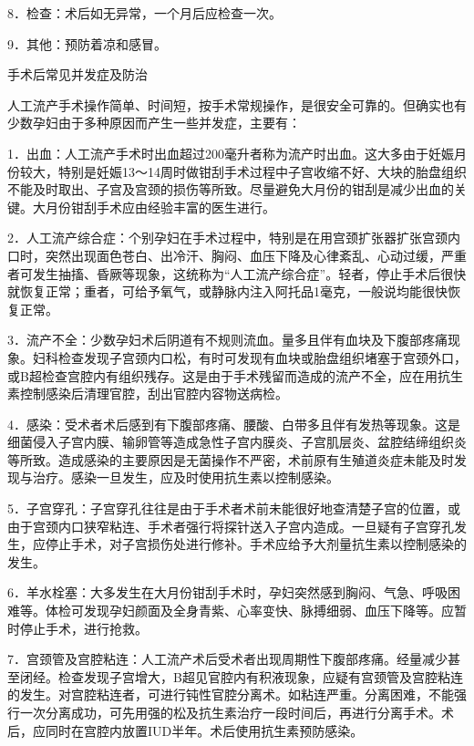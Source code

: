 \documentclass[12pt,UTF8,openany]{ctexbook}
\begin{document}
8．检查：术后如无异常，一个月后应检查一次。

9．其他：预防着凉和感冒。





手术后常见并发症及防治


人工流产手术操作简单、时间短，按手术常规操作，是很安全可靠的。但确实也有少数孕妇由于多种原因而产生一些并发症，主要有：

1．出血：人工流产手术时出血超过200毫升者称为流产时出血。这大多由于妊娠月份较大，特别是妊娠13～14周时做钳刮手术过程中子宫收缩不好、大块的胎盘组织不能及时取出、子宫及宫颈的损伤等所致。尽量避免大月份的钳刮是减少出血的关键。大月份钳刮手术应由经验丰富的医生进行。

2．人工流产综合症：个别孕妇在手术过程中，特别是在用宫颈扩张器扩张宫颈内口时，突然出现面色苍白、出冷汗、胸闷、血压下降及心律紊乱、心动过缓，严重者可发生抽搐、昏厥等现象，这统称为“人工流产综合症”。轻者，停止手术后很快就恢复正常；重者，可给予氧气，或静脉内注入阿托品1毫克，一般说均能很快恢复正常。

3．流产不全：少数孕妇术后阴道有不规则流血。量多且伴有血块及下腹部疼痛现象。妇科检查发现子宫颈内口松，有时可发现有血块或胎盘组织堵塞于宫颈外口，或B超检查宫腔内有组织残存。这是由于手术残留而造成的流产不全，应在用抗生素控制感染后清理官腔，刮出官腔内容物送病检。

4．感染：受术者术后感到有下腹部疼痛、腰酸、白带多且伴有发热等现象。这是细菌侵入子宫内膜、输卵管等造成急性子宫内膜炎、子宫肌层炎、盆腔结缔组织炎等所致。造成感染的主要原因是无菌操作不严密，术前原有生殖道炎症未能及时发现与治疗。感染一旦发生，应及时使用抗生素以控制感染。

5．子宫穿孔：子宫穿孔往往是由于手术者术前未能很好地查清楚子宫的位置，或由于宫颈内口狭窄粘连、手术者强行将探针送入子宫内造成。一旦疑有子宫穿孔发生，应停止手术，对子宫损伤处进行修补。手术应给予大剂量抗生素以控制感染的发生。

6．羊水栓塞：大多发生在大月份钳刮手术时，孕妇突然感到胸闷、气急、呼吸困难等。体检可发现孕妇颜面及全身青紫、心率变快、脉搏细弱、血压下降等。应暂时停止手术，进行抢救。

7．宫颈管及宫腔粘连：人工流产术后受术者出现周期性下腹部疼痛。经量减少甚至闭经。检查发现子宫增大，B超见官腔内有积液现象，应疑有宫颈管及宫腔粘连的发生。对宫腔粘连者，可进行钝性官腔分离术。如粘连严重。分离困难，不能强行一次分离成功，可先用强的松及抗生素治疗一段时间后，再进行分离手术。术后，应同时在宫腔内放置IUD半年。术后使用抗生素预防感染。
\end{document}

